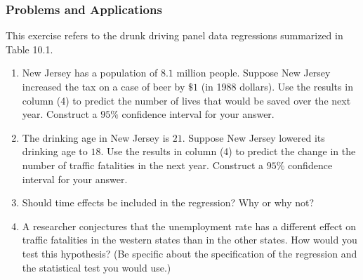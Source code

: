

\begin{frame}
\frametitle{Problems and Applications}
This exercise refers to the drunk driving panel data regressions summarized in Table 10.1.
\begin{enumerate}
\item New Jersey has a population of $8.1$ million people. Suppose New Jersey increased the tax on a case of beer by $\$1$ (in 1988 dollars). Use the results in column (4) to predict the number of lives that would be saved over the next year. Construct a $95\%$ confidence interval for your answer.
\item The drinking age in New Jersey is $21$. Suppose New Jersey lowered its drinking age to $18$. Use the results in column (4) to predict the change in the number of traffic fatalities in the next year. Construct a $95\%$ confidence interval for your answer.
\item Should time effects be included in the regression? Why or why not?
\item A researcher conjectures that the unemployment rate has a different effect on traffic fatalities in the western states than in the other states. How would you test this hypothesis? (Be specific about the specification of the regression and the statistical test you would use.)
\end{enumerate}
\end{frame}

